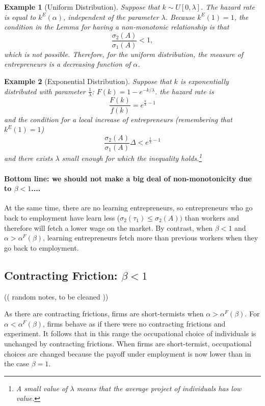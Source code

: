\documentclass[12pt]{article}
\newtheorem{example}{Example}
\begin{document}
%
\begin{example}[Uniform Distribution]
    Suppose that $k\sim U[0,\lambda]$. The hazard rate is equal to $k^E(\alpha)$, independent of the parameter $\lambda$. Because $k^E(1)=1$, the condition in the Lemma for having a non-monotonic relationship is that
    \[
        \frac{\sigma_2(A)}{\sigma_1(A)}<1,
    \]
    which is not possible. Therefore, for the uniform distribution, the measure of entrepreneurs is a decreasing function of $\alpha$.
\end{example}

\begin{example}[Exponential Distribution]
    Suppose that $k$ is exponentially distributed with parameter $\frac{1}{\lambda}$: $F(k)=1-e^{-k/\lambda}$. 
    the hazard rate is
    \[
        \frac{F(k)}{f(k)}= e^{\frac{k}{\lambda}-1}
    \]
    and the condition for a local increase of entrepreneurs (remembering that $k^E(1)=1$)
    \[
        \frac{\sigma_2(A)}{\sigma_1(A)}\Delta <e^{\frac{1}{\lambda}-1}
    \]
and there exists $\lambda$ small enough for which the inequality holds.\footnote{%
A small value of $\lambda$ means that the average project of individuals has low value.
}
\end{example}

\paragraph{Bottom line: we should not make a big deal of non-monotonicity due to $\beta<1$....}

At the same time, there are no learning entrepreneurs, so entrepreneurs who go back to employment have learn less ($\sigma_2(\tau_1)\leq \sigma_2(A))$ than workers and therefore will fetch a lower wage on the market. By contrast, when $\beta<1$ and $\alpha>\alpha^F(\beta)$, learning entrepreneurs fetch more than previous workers when they go back to employment.


\subsection{Contracting Friction: $\beta<1$}
 
 (( random notes, to be cleaned ))
 
As there are contracting frictions, firms are short-termists when $\alpha>\alpha^F(\beta)$. For $\alpha<\alpha^F(\beta)$, firms behave as if there were no contracting frictions and experiment. It follows that in this range the occupational choice of individuals is unchanged by contracting frictions. When firms are short-termist, occupational choices are changed because the payoff under employment is now lower than in the case $\beta=1$.
\end{document}
